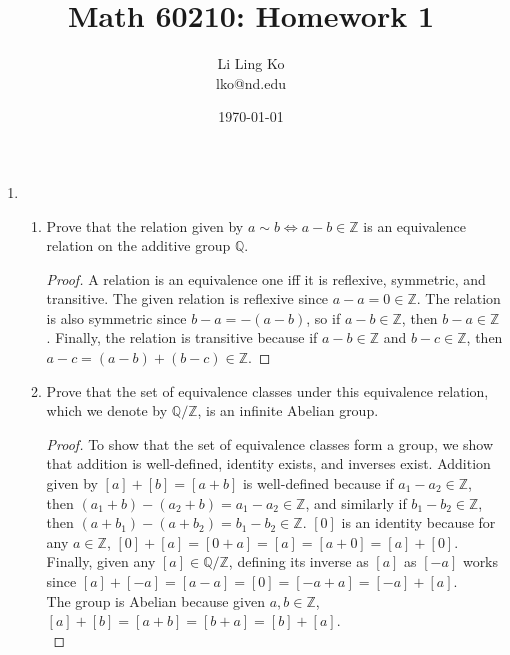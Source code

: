 \documentclass{article}
\begin{document}
\title{Math 60210: Homework 1}
\author{Li Ling Ko\\ lko@nd.edu}
\date{\today}
\maketitle

\begin{enumerate}
  \item
    \begin{enumerate}
      \item Prove that the relation given by $a \sim b \Longleftrightarrow
        a-b \in \mathbb{Z} $ is an equivalence relation on the additive group
        $\mathbb{Q}$.
        \begin{proof}
          A relation is an equivalence one iff it is reflexive, symmetric,
          and transitive. The given relation is reflexive since
          $a-a=0\in\mathbb{Z}$. The relation is also symmetric since
          $b-a=-(a-b)$, so if $a-b\in\mathbb{Z}$, then $b-a\in\mathbb{Z}$.
          Finally, the relation is transitive because if $a-b\in\mathbb{Z}$
          and $b-c\in\mathbb{Z}$, then $a-c=(a-b)+(b-c)\in\mathbb{Z}$.
        \end{proof}
      \item Prove that the set of equivalence classes under this equivalence
        relation, which we denote by $\mathbb{Q}/\mathbb{Z}$, is an infinite
        Abelian group.
        \begin{proof}
          To show that the set of equivalence classes form a group, we show
          that addition is well-defined, identity exists, and inverses exist.
          Addition given by $[a]+[b]=[a+b]$ is well-defined because if
          $a_1-a_2\in\mathbb{Z}$, then
          $(a_1+b)-(a_2+b)=a_1-a_2\in\mathbb{Z}$, and similarly if
          $b_1-b_2\in\mathbb{Z}$, then
          $(a+b_1)-(a+b_2)=b_1-b_2\in\mathbb{Z}$.
          $[0]$ is an identity because for any $a\in\mathbb{Z}$,
          $[0]+[a]=[0+a]=[a]=[a+0]=[a]+[0]$. Finally, given any
          $[a]\in\mathbb{Q}/\mathbb{Z}$, defining its inverse as $[a]$ as
          $[-a]$ works since $[a]+[-a]=[a-a]=[0]=[-a+a]=[-a]+[a]$. \\

          The group is Abelian because given $a,b\in\mathbb{Z}$,
          $[a]+[b]=[a+b]=[b+a]=[b]+[a]$. \\


\end{proof}
\end{enumerate}
\end{enumerate}
\end{document}
